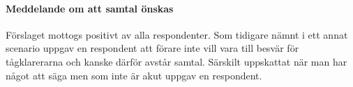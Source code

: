 \paragraph{Meddelande om att samtal önskas}
Förslaget mottogs positivt av alla respondenter.
Som tidigare nämnt i ett annat scenario uppgav en respondent att förare inte vill vara till besvär för tågklarerarna och kanske därför avstår samtal.
Särskilt uppskattat när man har något att säga men som inte är akut uppgav en respondent.